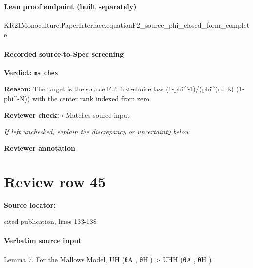 \documentclass[10pt]{article}
\newcommand{\reviewerbox}{%
  \par\noindent\fbox{\parbox{0.96\linewidth}{\rule{0pt}{0.38in}}}\par
}
\newcommand{\reviewmatch}[1]{%
  \par\noindent\textbf{Reviewer check:} $\square$\; #1\par
  \noindent\emph{If left unchecked, explain the discrepancy or uncertainty below.}\par
}
\begin{document}
\paragraph{Lean proof endpoint (built separately)}\begin{ReviewVerbatim}
KR21Monoculture.PaperInterface.equationF2_source_phi_closed_form_complete
\end{ReviewVerbatim}

\paragraph{Recorded source-to-Spec screening}
\textbf{Verdict:} \texttt{matches}
\\
{\raggedright
\textbf{Reason:} The target is the source F.\allowbreak{}2 first-\allowbreak{}choice law (1-\allowbreak{}phi\textasciicircum{}-\allowbreak{}1)/\allowbreak{}(phi\textasciicircum{}(rank) (1-\allowbreak{}phi\textasciicircum{}-\allowbreak{}N)) with the center rank indexed from zero.\allowbreak{}
\par}
\reviewmatch{Matches source input}
\noindent\textbf{Reviewer annotation}\par
\reviewerbox
\clearpage
\hypertarget{source-claim-1e4808a386b72297}{}
\section*{Review row 45}
\textbf{Source locator:} {\footnotesize\raggedright cited publication, lines 133-\allowbreak{}138\par}
\paragraph{Verbatim source input}
\begin{ReviewVerbatim}
Lemma 7. For the Mallows Model, UH (θA , θH ) > UHH (θA , θH ).
\end{ReviewVerbatim}
\end{document}

